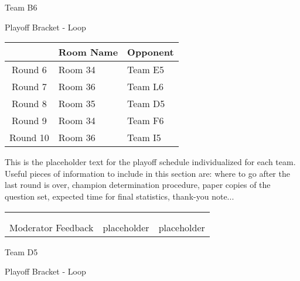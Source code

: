 \documentclass{article}%
\begin{document}
\newpage%
\begin{center}%
\begin{Huge}%
Team B6%
\end{Huge}%
\vspace*{12pt}%
\linebreak%
\begin{Large}%
Playoff Bracket {-} Loop%
\end{Large}%
\end{center}%
\vspace*{4pt}%
%
\begin{tabularx}{\textwidth}{|c|Y|Y|}%
\hline%
&Room Name&Opponent\\%
\hline%
Round 6&Room 34&Team E5\\%
Round 7&Room 36&Team L6\\%
Round 8&Room 35&Team D5\\%
Round 9&Room 34&Team F6\\%
Round 10&Room 36&Team I5\\%
\hline%
\end{tabularx}%
\vspace*{30pt}%
\linebreak%
This is the placeholder text for the playoff schedule individualized for each team. Useful pieces of information to include in this section are: where to go after the last round is over, champion determination procedure, paper copies of the question set, expected time for final statistics, thank{-}you note...%
\vspace*{30pt}%
\newline%
%
\begin{tabularx}{\textwidth}{YYY}%
  &  &  \\%
\\%
Moderator Feedback&placeholder&placeholder\\%
\end{tabularx}%
\newpage%
\begin{center}%
\begin{Huge}%
Team D5%
\end{Huge}%
\vspace*{12pt}%
\linebreak%
\begin{Large}%
Playoff Bracket {-} Loop%
\end{Large}%
\end{center}%
\end{document}
